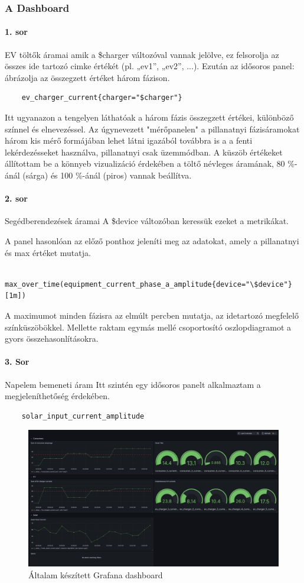 \subsubsection{A Dashboard}
\paragraph{1. sor}
EV töltők áramai amik a
\$charger változóval vannak jelölve, ez felsorolja az összes ide  tartozó cimke értékét 
(pl. „ev1”, „ev2”, ...).
Ezután az idősoros panel: ábrázolja az összegzett értéket három fázison.
\begin{lstlisting}
    ev_charger_current{charger="$charger"}
\end{lstlisting}
Itt ugyanazon a tengelyen láthatóak a három fázis összegzett értékei, 
különböző színnel és elnevezéssel.
Az úgynevezett "mérőpanelen" a pillanatnyi fázisáramokat három kis mérő formájában
lehet látni igazából továbbra is a a fenti lekérdezésseket használva, 
pillanatnyi csak üzemmódban.
A küszöb értékeket állítottam be a könnyeb vizualizáció érdekében 
a töltő névleges áramának, 
80 \%-ánál (sárga) és 100 \%-ánál (piros) vannak beállítva.

\paragraph{2. sor}
Segédberendezések áramai
A \$device változóban keressük ezeket a metrikákat.

A panel hasonlóan az előző ponthoz jeleníti meg az adatokat, amely a pillanatnyi 
és max értéket mutatja.
\begin{lstlisting}
    max_over_time(equipment_current_phase_a_amplitude{device="\$device"}[1m])
\end{lstlisting}
A maximumot minden fázisra az elmúlt percben mutatja, az idetartozó 
megfelelő színküszöbökkel.
Mellette raktam egymás mellé csoportosító oszlopdiagramot a gyors 
összehasonlításokra.

\paragraph{3. Sor}
Napelem bemeneti áram
Itt szintén egy idősoros panelt alkalmaztam a megjeleníthetőség érdekében.
\begin{lstlisting}
    solar_input_current_amplitude
\end{lstlisting}

\begin{figure}[!ht]
    \centering
    \includegraphics[width=1\textwidth, keepaspectratio]{figures/Grafana.png}
    \caption{Általam készített Grafana dashboard} 
\end{figure}